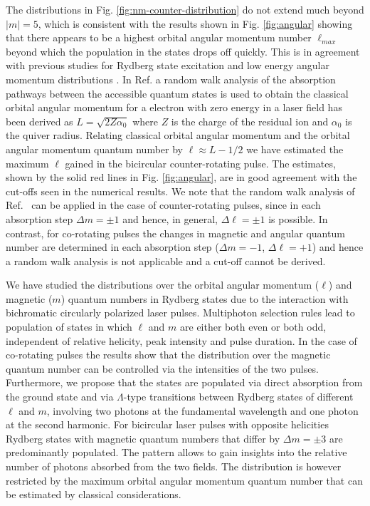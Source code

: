 The distributions in Fig. \ref{fig:nm-counter-distribution} do not extend much beyond $|m| = 5$, which is consistent with the results shown in Fig. \ref{fig:angular} showing that there appears to be a highest orbital angular momentum number $\ell_{max}$ beyond which the population in the states drops off quickly. This is in agreement with previous studies for Rydberg state excitation \cite{piraux17,venzke18} and low energy angular momentum distributions \cite{arbo08}. In Ref. \cite{arbo08} a random walk analysis of the absorption pathways between the accessible quantum states is used to obtain the classical orbital angular momentum for a electron with zero energy in a laser field has been derived as $L = \sqrt{2Z\alpha_0}$
where $Z$ is the charge of the residual ion and $\alpha_0$ is the quiver radius. Relating classical orbital angular momentum and the orbital angular momentum quantum number by $\ell \approx L - 1/2$ we have estimated the maximum $\ell$ gained in the bicircular counter-rotating pulse. The estimates, shown by the solid red lines in Fig. \ref{fig:angular}, are in good agreement with the cut-offs seen in the numerical results. We note that the random walk analysis of Ref.\ \cite{arbo08} can be applied in the case of counter-rotating pulses, since in each absorption step $\Delta m = \pm 1$ and hence, in general, $\Delta \ell = \pm 1$ is possible. In contrast, for co-rotating pulses the changes in magnetic and angular quantum number are determined in each absorption step ($\Delta m = -1$, $\Delta \ell = +1$) and hence a random walk analysis is not applicable and a cut-off cannot be derived.


We have studied the distributions over the orbital angular momentum ($\ell$) and magnetic ($m$) quantum numbers in Rydberg states due to the interaction with bichromatic circularly polarized laser pulses. Multiphoton selection rules lead to population of states in which $\ell$ and $m$ are either both even or both odd, independent of relative helicity, peak intensity and pulse duration. In the case of co-rotating pulses the results show that the distribution over the magnetic quantum number can be controlled via the intensities of the two pulses. Furthermore, we propose that the states are populated via direct absorption from the ground state and via $\Lambda$-type transitions between Rydberg states of different $\ell$ and $m$, involving two photons at the fundamental wavelength and one photon at the second harmonic. For bicircular laser pulses with opposite helicities Rydberg states with magnetic quantum numbers that differ by $\Delta m = \pm 3$ are predominantly populated. The pattern allows to gain insights into the relative number of photons absorbed from the two fields. The distribution is however restricted by the maximum orbital angular momentum quantum number that can be estimated by classical considerations.

